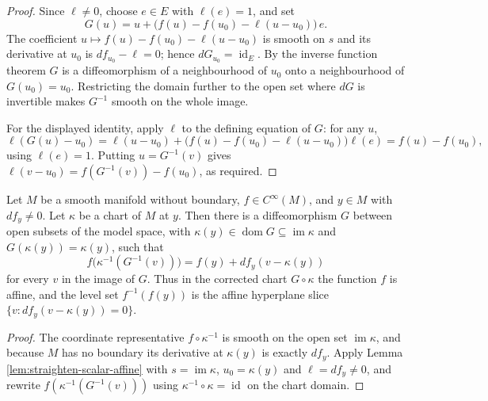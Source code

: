 \begin{proof}

Since $\ell \neq 0$, choose $e \in E$ with $\ell(e) = 1$, and set
\[
  G(u) = u + \bigl(f(u) - f(u_0) - \ell(u - u_0)\bigr)\, e .
\]
The coefficient $u \mapsto f(u) - f(u_0) - \ell(u - u_0)$ is smooth on $s$ and its derivative at $u_0$ is $df_{u_0} - \ell = 0$; hence $dG_{u_0} = \operatorname{id}_E$. By the inverse function theorem $G$ is a diffeomorphism of a neighbourhood of $u_0$ onto a neighbourhood of $G(u_0) = u_0$. Restricting the domain further to the open set where $dG$ is invertible makes $G^{-1}$ smooth on the whole image.

For the displayed identity, apply $\ell$ to the defining equation of $G$: for any $u$,
\[
  \ell(G(u) - u_0) = \ell(u - u_0) + \bigl(f(u) - f(u_0) - \ell(u - u_0)\bigr)\ell(e) = f(u) - f(u_0),
\]
using $\ell(e) = 1$. Putting $u = G^{-1}(v)$ gives $\ell(v - u_0) = f(G^{-1}(v)) - f(u_0)$, as required.
\end{proof}

\begin{lemma}
\label{lem:adapted-chart-scalar-affine}





Let $M$ be a smooth manifold without boundary, $f \in C^\infty(M)$, and $y \in M$ with $df_y \neq 0$. Let $\kappa$ be a chart of $M$ at $y$. Then there is a diffeomorphism $G$ between open subsets of the model space, with $\kappa(y) \in \operatorname{dom} G \subseteq \operatorname{im} \kappa$ and $G(\kappa(y)) = \kappa(y)$, such that
\[
  f\bigl(\kappa^{-1}(G^{-1}(v))\bigr) = f(y) + df_y(v - \kappa(y))
\]
for every $v$ in the image of $G$. Thus in the corrected chart $G \circ \kappa$ the function $f$ is affine, and the level set $f^{-1}(f(y))$ is the affine hyperplane slice $\{v : df_y(v - \kappa(y)) = 0\}$.
\end{lemma}

\begin{proof}

The coordinate representative $f \circ \kappa^{-1}$ is smooth on the open set $\operatorname{im} \kappa$, and because $M$ has no boundary its derivative at $\kappa(y)$ is exactly $df_y$. Apply Lemma \ref{lem:straighten-scalar-affine} with $s = \operatorname{im}\kappa$, $u_0 = \kappa(y)$ and $\ell = df_y \neq 0$, and rewrite $f(\kappa^{-1}(G^{-1}(v)))$ using $\kappa^{-1} \circ \kappa = \operatorname{id}$ on the chart domain.
\end{proof}

